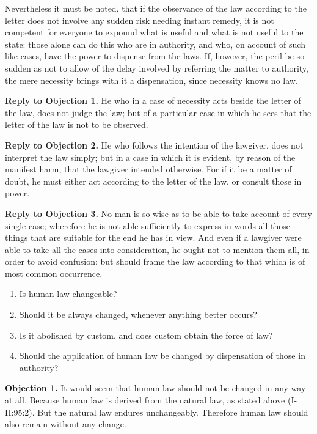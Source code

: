 Nevertheless it must be noted, that if the observance of the law according to the letter does not involve any sudden risk needing instant remedy, it is not competent for everyone to expound what is useful and what is not useful to the state: those alone can do this who are in authority, and who, on account of such like cases, have the power to dispense from the laws. If, however, the peril be so sudden as not to allow of the delay involved by referring the matter to authority, the mere necessity brings with it a dispensation, since necessity knows no law.

\textbf{Reply to Objection 1.} He who in a case of necessity acts beside the letter of the law, does not judge the law; but of a particular case in which he sees that the letter of the law is not to be observed.

\textbf{Reply to Objection 2.} He who follows the intention of the lawgiver, does not interpret the law simply; but in a case in which it is evident, by reason of the manifest harm, that the lawgiver intended otherwise. For if it be a matter of doubt, he must either act according to the letter of the law, or consult those in power.

\textbf{Reply to Objection 3.} No man is so wise as to be able to take account of every single case; wherefore he is not able sufficiently to express in words all those things that are suitable for the end he has in view. And even if a lawgiver were able to take all the cases into consideration, he ought not to mention them all, in order to avoid confusion: but should frame the law according to that which is of most common occurrence.


\begin{enumerate}

\item  Is human law changeable? 
\item  Should it be always changed, whenever anything better occurs? 
\item  Is it abolished by custom, and does custom obtain the force of law? 
\item  Should the application of human law be changed by dispensation of those in authority? 
\end{enumerate}


\textbf{Objection 1.} It would seem that human law should not be changed in any way at all. Because human law is derived from the natural law, as stated above (I-II:95:2). But the natural law endures unchangeably. Therefore human law should also remain without any change.

